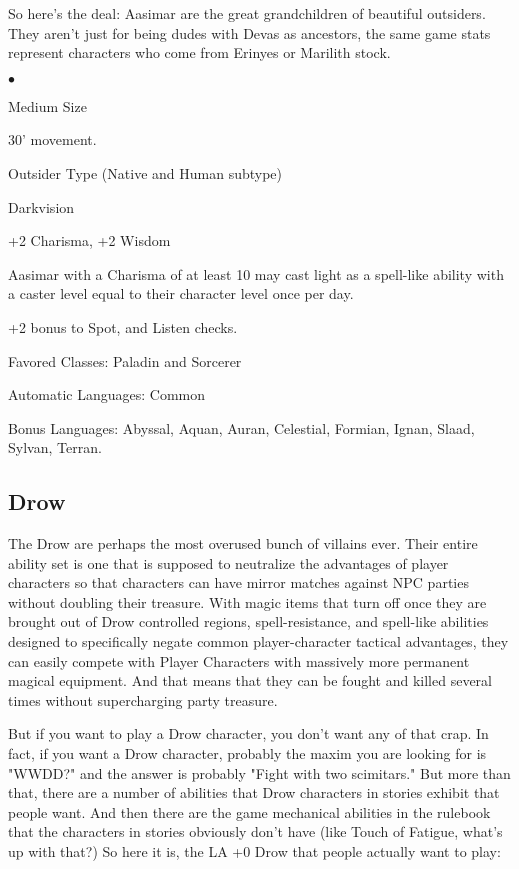 So here's the deal: Aasimar are the great grandchildren of beautiful outsiders. They aren't just for being dudes with Devas as ancestors, the same game stats represent characters who come from Erinyes or Marilith stock.

\begin{list}{$\bullet$}{\itemspace}
    \item Medium Size
    \item 30' movement.
    \item Outsider Type (Native and Human subtype)
    \item Darkvision
    \item +2 Charisma, +2 Wisdom
    \item Aasimar with a Charisma of at least 10 may cast light as a spell-like ability with a caster level equal to their character level once per day.
    \item +2 bonus to Spot, and Listen checks.
    \item Favored Classes: Paladin and Sorcerer
    \item Automatic Languages: Common
    \item Bonus Languages: Abyssal, Aquan, Auran, Celestial, Formian, Ignan, Slaad, Sylvan, Terran.
\end{list}



\subsection{Drow}
\vspace*{-8pt}

The Drow are perhaps the most overused bunch of villains ever. Their entire ability set is one that is supposed to neutralize the advantages of player characters so that characters can have mirror matches against NPC parties without doubling their treasure. With magic items that turn off once they are brought out of Drow controlled regions, spell-resistance, and spell-like abilities designed to specifically negate common player-character tactical advantages, they can easily compete with Player Characters with massively more permanent magical equipment. And that means that they can be fought and killed several times without supercharging party treasure.

But if you want to play a Drow character, you don't want any of that crap. In fact, if you want a Drow character, probably the maxim you are looking for is "WWDD?" and the answer is probably "Fight with two scimitars." But more than that, there are a number of abilities that Drow characters in stories exhibit that people want. And then there are the game mechanical abilities in the rulebook that the characters in stories obviously don't have (like Touch of Fatigue, what's up with that?) So here it is, the LA +0 Drow that people actually want to play:

